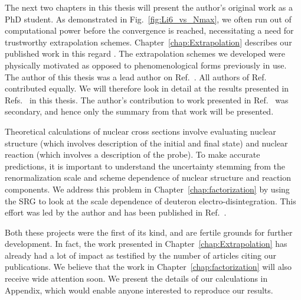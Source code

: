 	The next two chapters in this thesis will present the author's
	original work as a PhD student.
	As demonstrated in Fig.~\ref{fig:Li6_vs_Nmax}, we often run out of
	computational power before the convergence is reached, necessitating a need
	for trustworthy extrapolation schemes.
	Chapter~\ref{chap:Extrapolation} describes our published work in this
	regard \cite{More:2013rma,Furnstahl:2013vda,Konig:2014hma}.
	The extrapolation schemes we developed were physically motivated as opposed
	to phenomenological forms previously in use.
	The author of this thesis was a lead author on Ref.~\cite{More:2013rma}.
	All authors of Ref.~\cite{Furnstahl:2013vda} contributed equally.
	We will therefore look in detail at the results presented in
	Refs.~\cite{More:2013rma, Furnstahl:2013vda} in this thesis.
	The author's contribution to work presented in Ref.~\cite{Konig:2014hma}
	was secondary, and hence only the summary from that work will be
	presented.

	Theoretical calculations of nuclear cross sections involve evaluating
	nuclear structure (which involves description of the initial and final state)
	and	nuclear reaction (which involves a description of the probe).  To make
	accurate predictions, it is important to understand the uncertainty
	stemming from the renormalization scale and scheme dependence of
	nuclear structure and reaction components.  We address this problem in
	Chapter~\ref{chap:factorization} by using the SRG to look at the scale
	dependence of deuteron electro-disintegration.  This effort was led by the
	author and has been published in Ref.~\cite{More:2015tpa}.

	Both these projects were the first of its kind, and are fertile grounds for
	further	development.  In fact, the work presented in
	Chapter~\ref{chap:Extrapolation} has already had a lot of impact as testified
	by the number of articles citing our publications.  We believe that the
	work in Chapter~\ref{chap:factorization} will also receive wide
	attention soon.  We present the details of our calculations in Appendix, which
	would enable anyone interested to reproduce our results.
